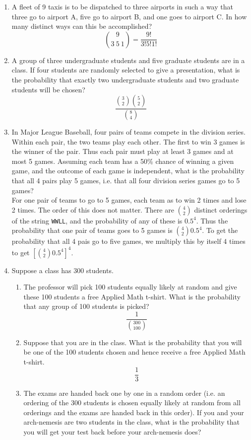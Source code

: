 \documentclass[12pt]{article}
\begin{document}
\begin{enumerate}
\item A fleet of 9 taxis is to be dispatched to three airports in such a way that three go to airport A, five go to airport B, and one goes to airport C. In how many distinct ways can this be accomplished?
\[
\binom{9}{3\:5\:1} = \frac{9!}{3!5!1!}
\]

\item A group of three undergraduate students and five graduate students are in a class. If four students are randomly selected to give a presentation, what is the probability that exactly two undergraduate students and two graduate students will be chosen?
\[
\dfrac{\binom{3}{2}\binom{5}{2}}{\binom{8}{4}}
\]

\item In Major League Baseball, four pairs of teams compete in the division series. Within each pair, the two teams play each other. The first to win 3 games is the winner of the pair. Thus each pair must play at least 3 games and at most 5 games. Assuming each team has a 50\% chance of winning a given game, and the outcome of each game is independent, what is the probability that all 4 pairs play 5 games, i.e. that all four division series games go to 5 games?\\

For one pair of teams to go to 5 games, each team as to win 2 times and lose 2 times. The order of this does not matter. There are $\binom{4}{2}$ distinct orderings of the string \texttt{WWLL}, and the probability of any of these is $0.5^4$. Thus the probability that one pair of teams goes to 5 games is $\binom{4}{2} 0.5^4$. To get the probability that all 4 pais go to five games, we multiply this by itself 4 times to get $[\binom{4}{2} 0.5^4]^4 $.

\item Suppose a class has 300 students.\\
\begin{enumerate}
\item The professor will pick 100 students equally likely at random and give these 100 students a free Applied Math t-shirt. What is the probability that any group of 100 students is picked?
\[
\frac{1}{\binom{300}{100}}
\]
\item Suppose that you are in the class. What is the probability that you will be one of the 100 students chosen and hence receive a free Applied Math t-shirt.
\[
\frac{1}{3}
\]
\item The exams are handed back one by one in a random order (i.e. an ordering of the 300 students is chosen equally likely at random from all orderings and the exams are handed back in this order). If you and your arch-nemesis are two students in the class, what is the probability that you will get your test back before your arch-nemesis does?\\


\end{enumerate}
\end{enumerate}
\end{document}
